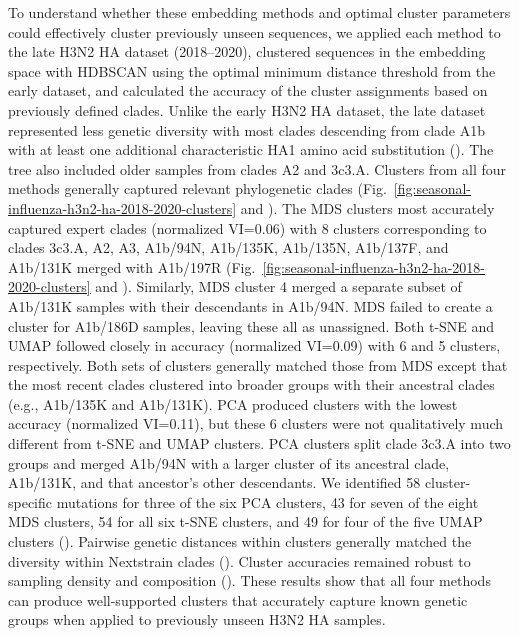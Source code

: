 \documentclass[10pt,letterpaper]{article}
\begin{document}
To understand whether these embedding methods and optimal cluster parameters could effectively cluster previously unseen sequences, we applied each method to the late H3N2 HA dataset (2018--2020), clustered sequences in the embedding space with HDBSCAN using the optimal minimum distance threshold from the early dataset, and calculated the accuracy of the cluster assignments based on previously defined clades.
Unlike the early H3N2 HA dataset, the late dataset represented less genetic diversity with most clades descending from clade A1b with at least one additional characteristic HA1 amino acid substitution ().
The tree also included older samples from clades A2 and 3c3.A.
Clusters from all four methods generally captured relevant phylogenetic clades (Fig.~\ref{fig:seasonal-influenza-h3n2-ha-2018-2020-clusters} and ).
The MDS clusters most accurately captured expert clades (normalized VI=0.06) with 8 clusters corresponding to clades 3c3.A, A2, A3, A1b/94N, A1b/135K, A1b/135N, A1b/137F, and A1b/131K merged with A1b/197R (Fig.~\ref{fig:seasonal-influenza-h3n2-ha-2018-2020-clusters} and ).
Similarly, MDS cluster 4 merged a separate subset of A1b/131K samples with their descendants in A1b/94N.
MDS failed to create a cluster for A1b/186D samples, leaving these all as unassigned.
Both t-SNE and UMAP followed closely in accuracy (normalized VI=0.09) with 6 and 5 clusters, respectively.
Both sets of clusters generally matched those from MDS except that the most recent clades clustered into broader groups with their ancestral clades (e.g., A1b/135K and A1b/131K).
PCA produced clusters with the lowest accuracy (normalized VI=0.11), but these 6 clusters were not qualitatively much different from t-SNE and UMAP clusters.
PCA clusters split clade 3c3.A into two groups and merged A1b/94N with a larger cluster of its ancestral clade, A1b/131K, and that ancestor's other descendants.
We identified 58 cluster-specific mutations for three of the six PCA clusters, 43 for seven of the eight MDS clusters, 54 for all six t-SNE clusters, and 49 for four of the five UMAP clusters ().
Pairwise genetic distances within clusters generally matched the diversity within Nextstrain clades ().
Cluster accuracies remained robust to sampling density and composition ().
These results show that all four methods can produce well-supported clusters that accurately capture known genetic groups when applied to previously unseen H3N2 HA samples.
\end{document}
